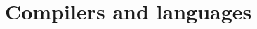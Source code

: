 \documentclass[11pt,oneside,a4paper]{report}
\begin{document}
\part{Compilers and languages}



{}

\end{document}
